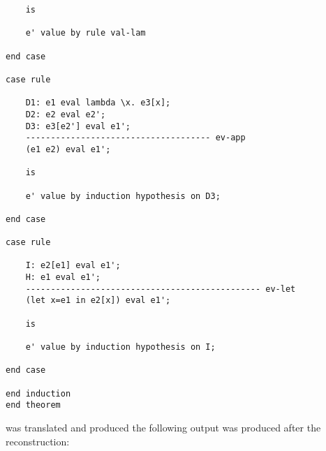 \documentclass[12pt]{article}
\begin{document}
\begin{verbatim}
	is

	e' value by rule val-lam

end case

case rule

	D1: e1 eval lambda \x. e3[x];
	D2: e2 eval e2';
	D3: e3[e2'] eval e1';
	------------------------------------- ev-app
	(e1 e2) eval e1';

	is

	e' value by induction hypothesis on D3;

end case

case rule

	I: e2[e1] eval e1';
	H: e1 eval e1';
	----------------------------------------------- ev-let
	(let x=e1 in e2[x]) eval e1';

	is

	e' value by induction hypothesis on I;

end case

end induction
end theorem

\end{verbatim}
was translated and produced the following output was produced after the reconstruction:
\end{document}
